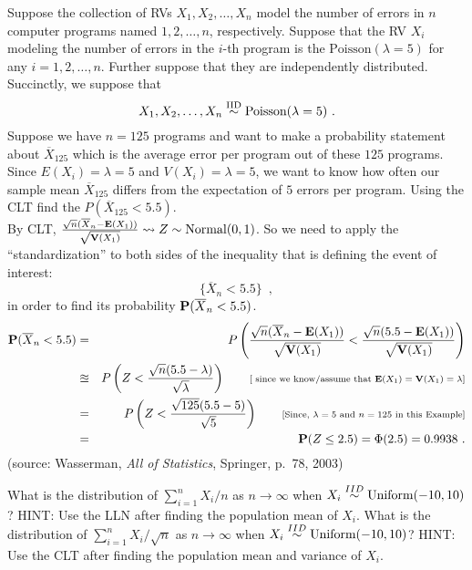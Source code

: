 \begin{ExerciseList}
\Exercise 
Suppose the collection of RVs $X_1,X_2, \ldots, X_n$ model the number of errors in $n$ computer programs named $1,2,\ldots,n$, respectively.  Suppose that the RV $X_i$ modeling the number of errors in the $i$-th program is the $\textrm{Poisson}(\lambda=5)$ for any $i=1,2,\ldots,n$.  Further suppose that they are independently distributed.  Succinctly, we suppose that 
\[
X_1,X_2,\ldots,X_n \overset{{\rm IID}}{\sim} \mbox{{\rm Poisson}}(\lambda=5) \ . 
\]
Suppose we have $n=125$ programs and want to make a probability statement about $\overline{X}_{125}$ which is the average error per program out of these $125$ programs.  Since $E(X_i) = \lambda=5$ and $V(X_i)=\lambda=5$, we want to know how often our sample mean $\overline{X}_{125}$ differs from the expectation of $5$ errors per program.  
Using the CLT find the $P(\overline{X}_{125} < 5.5)$.
\Answer
~\\
By CLT, $\frac{\sqrt{n}(\overline{X}_n - \mathbf{E}(X_1))}{\sqrt{\mathbf{V}(X_1)}} \rightsquigarrow Z \sim \mathrm{Normal}(0,1)$.  
So we need to apply the ``standardization'' to both sides of the inequality that is defining the event of interest:
$$\{\overline{X}_n < 5.5\} \enspace ,$$ 
in order to find its probability $\mathbf{P}(\overline{X}_n < 5.5)$.
~\\
\begin{eqnarray}
\mathbf{P}(\overline{X}_n < 5.5) 
&=& P \left( \frac{\sqrt{n}(\overline{X}_n - \mathbf{E}(X_1))}{\sqrt{\mathbf{V}(X_1)}} < \frac{\sqrt{n}(5.5-\mathbf{E}(X_1))}{\sqrt{\mathbf{V}(X_1)}} \right) \notag \\
&\approxeq& P \left( Z < \frac{\sqrt{n}(5.5-\lambda)}{\sqrt{\lambda}} \right) \qquad \text{{\scriptsize [
since we know/assume that $\mathbf{E}(X_1)=\mathbf{V}(X_1)=\lambda$]}} \notag \\
&=& P \left( Z < \frac{\sqrt{125}(5.5-5)}{\sqrt{5}} \right) \qquad \text{{\scriptsize [Since, $\lambda=5$ and $n=125$ in this Example]}} \notag \\
&=& \mathbf{P}(Z \leq 2.5) = \Phi(2.5) = 0.9938\ . \notag
\end{eqnarray}
(source: Wasserman, {\em All of Statistics}, Springer, p.~78, 2003)


\Exercise
What is the distribution of $\sum_{i=1}^n{X_i}/n$ as $n \to \infty$ when $X_i \overset{IID}{\sim} \mbox{{\rm Uniform}}(-10,10)$?
\Answer
HINT: Use the LLN after finding the population mean of $X_i$.
\Exercise
What is the distribution of $\sum_{i=1}^n{X_i}/\sqrt{n}$ as $n \to \infty$ when $X_i \overset{IID}{\sim} \mbox{{\rm Uniform}}(-10,10)$?
\Answer
HINT: Use the CLT after finding the population mean and variance of $X_i$.
\end{ExerciseList}
